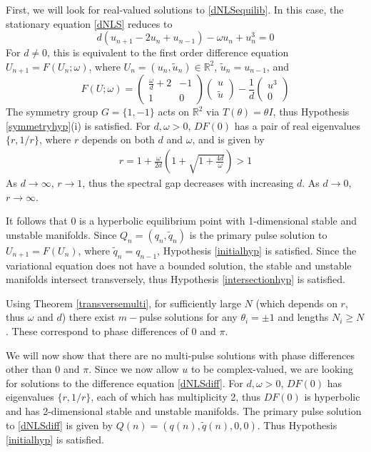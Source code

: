\documentclass[12pt]{article}
\def\R{{\mathbb R}}
\begin{document}
First, we will look for real-valued solutions to \eqref{dNLSequilib}. In this case, the stationary equation \eqref{dNLS} reduces to
\begin{equation*}
d(u_{n+1} - 2 u_n + u_{n-1}) - \omega u_n + u_n^3 = 0
\end{equation*}
For $d \neq 0$, this is equivalent to the first order difference equation $U_{n+1} = F(U_n; \omega)$, where $U_n = (u_n, \tilde{u}_n) \in \R^2$, $\tilde{u}_n = u_{n-1}$, and 
\begin{equation}\label{dnlsdiffR2}
F(U; \omega) = 
\begin{pmatrix}
\frac{\omega}{d} + 2 & -1 \\
1 & 0
\end{pmatrix}
\begin{pmatrix}
u \\ \tilde{u}
\end{pmatrix}
- \frac{1}{d} 
\begin{pmatrix}
u^3 \\ 0
\end{pmatrix}
\end{equation}
The symmetry group $G = \{ 1, -1\}$ acts on $\R^2$ via $T(\theta) = \theta I$, thus Hypothesis \ref{symmetryhyp}(i) is satisfied. For $d, \omega > 0$, $DF(0)$ has a pair of real eigenvalues $\{r, 1/r \}$, where $r$ depends on both $d$ and $\omega$, and is given by
\begin{align}\label{defr}
r = 1 + \frac{\omega}{2 d} \left( 1 + \sqrt{1 + \frac{4 d}{\omega}} \right) > 1
\end{align}
As $d \rightarrow \infty$, $r \rightarrow 1$, thus the spectral gap decreases with increasing $d$. As $d \rightarrow 0$, $r \rightarrow \infty$.

It follows that 0 is a hyperbolic equilibrium point with 1-dimensional stable and unstable manifolds. Since $Q_n = (q_n, \tilde{q}_n)$ is the primary pulse solution to $U_{n+1} = F(U_n)$, where $\tilde{q}_n = q_{n-1}$, Hypothesis \ref{initialhyp} is satisfied. Since the variational equation does not have a bounded solution, the stable and unstable manifolds intersect transversely, thus Hypothesis \ref{intersectionhyp} is satisfied. 

Using Theorem \ref{transversemulti}, for sufficiently large $N$ (which depends on $r$, thus $\omega$ and $d$) there exist $m-$pulse solutions for any $\theta_i = \pm 1$ and lengths $N_i \geq N$. These correspond to phase differences of $0$ and $\pi$.

We will now show that there are no multi-pulse solutions with phase differences other than $0$ and $\pi$. Since we now allow $u$ to be complex-valued, we are looking for solutions to the difference equation \eqref{dNLSdiff}. For $d, \omega > 0$, $DF(0)$ has eigenvalues $\{r, 1/r\}$, each of which has multiplicity 2, thus $DF(0)$ is hyperbolic and has 2-dimensional stable and unstable manifolds. The primary pulse solution to \eqref{dNLSdiff} is given by $Q(n) = (q(n), \tilde{q}(n), 0, 0)$. Thus Hypothesis \ref{initialhyp} is satisfied. 
\end{document}
